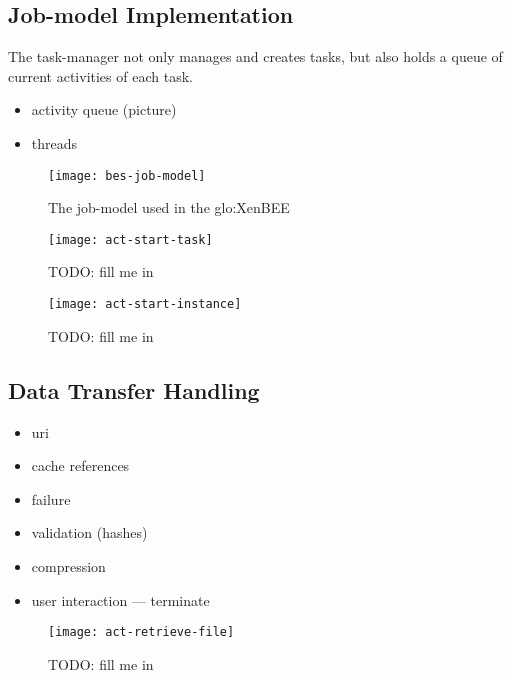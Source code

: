 \subsection{Job-model Implementation}
\label{sec:xbed:job-model}

The  task-manager not only  manages and  creates tasks,  but also  holds a
queue of current activities of each task.


\begin{itemize}
\item activity queue (picture)
\item threads
\end{itemize}

\begin{figure}[ht]
  \centering
  \texttt{[image: bes-job-model]}
  \caption{The job-model used in the \gls{glo:XenBEE}}
  \label{fig:bes-extended-xen}
\end{figure}

\begin{figure}[ht]
  \centering
  \texttt{[image: act-start-task]}
  \caption[Start Task Activity]{TODO: fill me in}
  \label{fig:act-start-task}
\end{figure}

\begin{figure}[ht]
  \centering
  \texttt{[image: act-start-instance]}
  \caption[Start Instance Activity]{TODO: fill me in}
  \label{fig:act-start-instance}
\end{figure}


\subsection{Data Transfer Handling}
\label{sec:xbed:data-transfer}

\begin{itemize}
\item uri
\item cache references
\item failure
\item validation (hashes)
\item compression
\item user interaction --- terminate
\end{itemize}

\begin{figure}[ht]
  \centering
  \texttt{[image: act-retrieve-file]}
  \caption[File Retrieval Activity]{TODO: fill me in}
  \label{fig:act-retrieve-file}
\end{figure}


